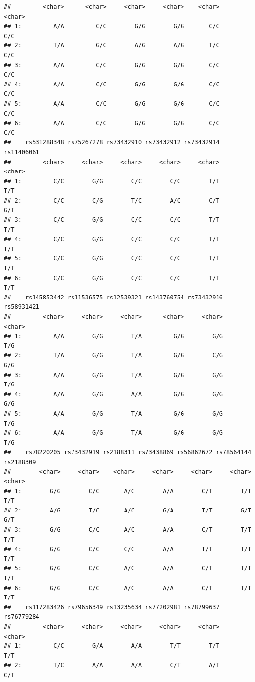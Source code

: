 \documentclass[
]{article}
\begin{document}
\begin{verbatim}
##         <char>      <char>     <char>     <char>    <char>      <char>
## 1:         A/A         C/C        G/G        G/G       C/C         C/C
## 2:         T/A         G/C        A/G        A/G       T/C         C/C
## 3:         A/A         C/C        G/G        G/G       C/C         C/C
## 4:         A/A         C/C        G/G        G/G       C/C         C/C
## 5:         A/A         C/C        G/G        G/G       C/C         C/C
## 6:         A/A         C/C        G/G        G/G       C/C         C/C
##    rs531288348 rs75267278 rs73432910 rs73432912 rs73432914 rs11406061
##         <char>     <char>     <char>     <char>     <char>     <char>
## 1:         C/C        G/G        C/C        C/C        T/T        T/T
## 2:         C/C        C/G        T/C        A/C        C/T        G/T
## 3:         C/C        G/G        C/C        C/C        T/T        T/T
## 4:         C/C        G/G        C/C        C/C        T/T        T/T
## 5:         C/C        G/G        C/C        C/C        T/T        T/T
## 6:         C/C        G/G        C/C        C/C        T/T        T/T
##    rs145853442 rs11536575 rs12539321 rs143760754 rs73432916 rs58931421
##         <char>     <char>     <char>      <char>     <char>     <char>
## 1:         A/A        G/G        T/A         G/G        G/G        T/G
## 2:         T/A        G/G        T/A         G/G        C/G        G/G
## 3:         A/A        G/G        T/A         G/G        G/G        T/G
## 4:         A/A        G/G        A/A         G/G        G/G        G/G
## 5:         A/A        G/G        T/A         G/G        G/G        T/G
## 6:         A/A        G/G        T/A         G/G        G/G        T/G
##    rs78220205 rs73432919 rs2188311 rs73438869 rs56862672 rs78564144 rs2188309
##        <char>     <char>    <char>     <char>     <char>     <char>    <char>
## 1:        G/G        C/C       A/C        A/A        C/T        T/T       T/T
## 2:        A/G        T/C       A/C        G/A        T/T        G/T       G/T
## 3:        G/G        C/C       A/C        A/A        C/T        T/T       T/T
## 4:        G/G        C/C       C/C        A/A        T/T        T/T       T/T
## 5:        G/G        C/C       A/C        A/A        C/T        T/T       T/T
## 6:        G/G        C/C       A/C        A/A        C/T        T/T       T/T
##    rs117283426 rs79656349 rs13235634 rs77202981 rs78799637 rs76779284
##         <char>     <char>     <char>     <char>     <char>     <char>
## 1:         C/C        G/A        A/A        T/T        T/T        T/T
## 2:         T/C        A/A        A/A        C/T        A/T        C/T

\end{verbatim}
\end{document}
